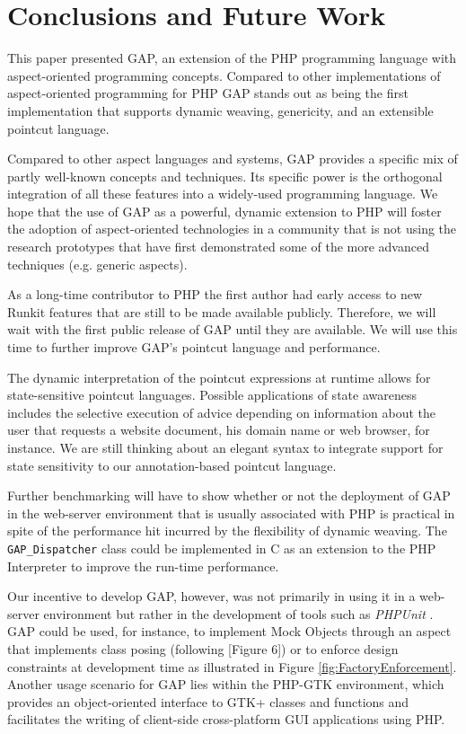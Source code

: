 \documentclass{acm_proc_article-sp}
\begin{document}
\section{Conclusions and Future Work}
This paper presented GAP, an extension of the PHP programming
language with aspect-oriented programming concepts. Compared to
other implementations of aspect-oriented programming for PHP GAP
stands out as being the first implementation that supports dynamic
weaving, genericity, and an extensible pointcut language.

Compared to other aspect languages and systems, GAP provides a
specific mix of partly well-known concepts and techniques. Its
specific power is the orthogonal integration of all these features
into a widely-used programming language. We hope that the use of
GAP as a powerful, dynamic extension to PHP will foster the
adoption of aspect-oriented technologies in a community that is
not using the research prototypes that have first demonstrated
some of the more advanced techniques (e.g. generic aspects).

As a long-time contributor to PHP the first author had early
access to new Runkit features that are still to be made available
publicly. Therefore, we will wait with the first public release of
GAP until they are available. We will use this time to further
improve GAP's pointcut language and performance.

The dynamic interpretation of the pointcut expressions at runtime
allows for state-sensitive pointcut languages. Possible
applications of state awareness includes the selective execution
of advice depending on information about the user that requests a
website document, his domain name or web browser, for instance. We
are still thinking about an elegant syntax to integrate support
for state sensitivity to our annotation-based pointcut language.

Further benchmarking will have to show whether or not the
deployment of GAP in the web-server environment that is usually
associated with PHP is practical in spite of the performance hit
incurred by the flexibility of dynamic weaving. The
\texttt{GAP\_Dispatcher} class could be implemented in C as an
extension to the PHP Interpreter to improve the run-time
performance.

Our incentive to develop GAP, however, was not primarily in using it in a
web-server environment but rather in the development of tools such
as \emph{PHPUnit} \cite{PHPUnit}. GAP could be used, for instance,
to implement Mock Objects through an aspect that implements class
posing (following \cite{kr06}[Figure 6]) or to enforce design constraints at development
time as illustrated in Figure \ref{fig:FactoryEnforcement}.
Another usage scenario for GAP lies within the PHP-GTK \cite{PHP-GTK}
environment, which provides an object-oriented interface to GTK+ \cite{GTK}
classes and functions and facilitates the writing of client-side
cross-platform GUI applications using PHP.
\end{document}
